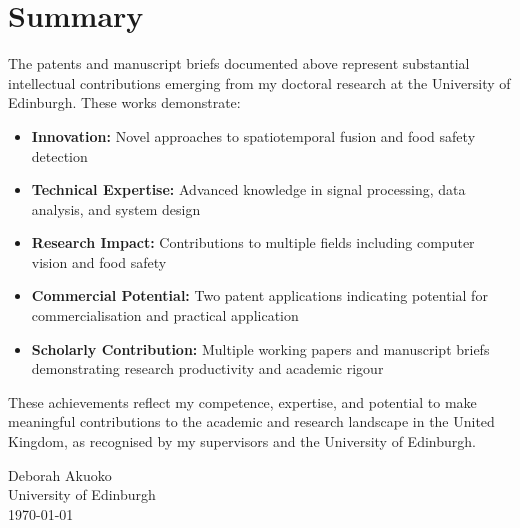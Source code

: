 \documentclass[12pt,a4paper]{article}
\begin{document}
\vspace{0.5cm}

\section{Summary}

The patents and manuscript briefs documented above represent substantial intellectual contributions emerging from my doctoral research at the University of Edinburgh. These works demonstrate:

\begin{itemize}[leftmargin=*]
\item \textbf{Innovation:} Novel approaches to spatiotemporal fusion and food safety detection
\item \textbf{Technical Expertise:} Advanced knowledge in signal processing, data analysis, and system design
\item \textbf{Research Impact:} Contributions to multiple fields including computer vision and food safety
\item \textbf{Commercial Potential:} Two patent applications indicating potential for commercialisation and practical application
\item \textbf{Scholarly Contribution:} Multiple working papers and manuscript briefs demonstrating research productivity and academic rigour
\end{itemize}

These achievements reflect my competence, expertise, and potential to make meaningful contributions to the academic and research landscape in the United Kingdom, as recognised by my supervisors and the University of Edinburgh.

\vspace{0.3cm}

\begin{flushright}
Deborah Akuoko\\
University of Edinburgh\\
\today
\end{flushright}
\end{document}
